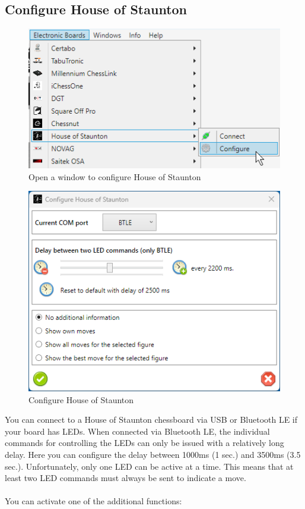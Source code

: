 \documentclass[11pt,a4paper]{article}
\begin{document}
\subsection{Configure House of Staunton} \label{ConnectHOS}
\begin{figure}[H]
	\centering
	\includegraphics[scale=1.0]{HOS1.png}
	\caption{Open a window to configure House of Staunton}
	\label{fig:HOS1}
\end{figure}

\begin{figure}[H]
	\centering
	\includegraphics[scale=1.0]{HOS2.png}
	\caption{Configure House of Staunton }
	\label{fig:HOS2}
\end{figure}

You can connect to a House of Staunton chessboard via USB or Bluetooth LE if your board has LEDs. 
When connected via Bluetooth LE, the individual commands for controlling the LEDs can only be issued with a relatively long delay. Here you can configure the delay between 1000ms (1 sec.) and 3500ms (3.5 sec.). Unfortunately, only one LED can be active at a time. This means that at least two LED commands must always be sent to indicate a move.\\\\
You can activate one of the additional functions:\\
\end{document}
